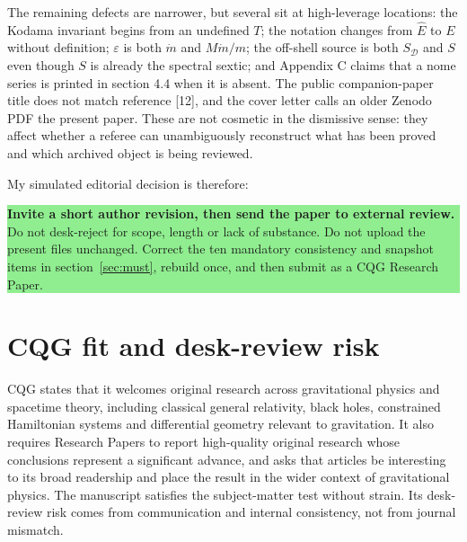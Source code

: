 \documentclass[11pt,a4paper]{article}
\newcommand{\Ehat}{\hat E}
\newcommand{\SD}{S_{\mathcal D}}
\begin{document}
The remaining defects are narrower, but several sit at high-leverage locations: the Kodama
invariant begins from an undefined $T$; the notation changes from $\Ehat$ to $E$ without
definition; $\varepsilon$ is both $\dot m$ and $M\dot m/m$; the off-shell source is both
$\SD$ and $S$ even though $S$ is already the spectral sextic; and Appendix C claims that
a nome series is printed in section 4.4 when it is absent. The public companion-paper title
does not match reference [12], and the cover letter calls an older Zenodo PDF the present
paper. These are not cosmetic in the dismissive sense: they affect whether a referee can
unambiguously reconstruct what has been proved and which archived object is being reviewed.

My simulated editorial decision is therefore:

\begin{center}
\colorbox{LightGreen}{\parbox{0.90\textwidth}{
\textbf{Invite a short author revision, then send the paper to external review.}
Do not desk-reject for scope, length or lack of substance. Do not upload the present files
unchanged. Correct the ten mandatory consistency and snapshot items in section~\ref{sec:must},
rebuild once, and then submit as a CQG Research Paper.
}}
\end{center}

\clearpage
\section{CQG fit and desk-review risk}

CQG states that it welcomes original research across gravitational physics and spacetime
theory, including classical general relativity, black holes, constrained Hamiltonian
systems and differential geometry relevant to gravitation. It also requires Research
Papers to report high-quality original research whose conclusions represent a significant
advance, and asks that articles be interesting to its broad readership and place the result
in the wider context of gravitational physics. The manuscript satisfies the subject-matter
test without strain. Its desk-review risk comes from communication and internal consistency,
not from journal mismatch.
\end{document}

